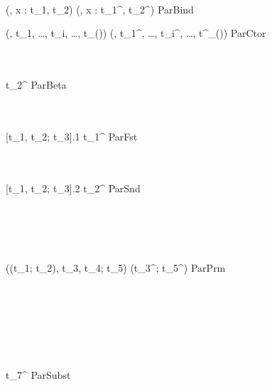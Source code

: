
\Rule{\ParBinderReduction}
    {
         \\
    }
    {(\kappa, x : t_1, t_2) \parred {}(\kappa, x : t_1^\prime, t_2^\prime) }
    {ParBind}

\Rule{\ParConstructorReduction}
    {
    }
    {(\kappa, t_1, \ldots, t_i, \ldots, t_{(\kappa)}) \parred {}(\kappa, t_1^\prime, \ldots, t_i^\prime, \ldots, t^\prime_{(\kappa)}) }
    {ParCtor}

\Rule{\ParBetaReduction}
    {
         \\
         \\
    }
    {  \parred [x := t_3^\prime]t_2^\prime }
    {ParBeta}

\Rule{\ParFstReduction}
    {
         \\
         \\
    }
    { [t_1, t_2; t_3].1 \parred t_1^\prime }
    {ParFst}

\Rule{\ParSndReduction}
    {
         \\
         \\
    }
    { [t_1, t_2; t_3].2 \parred t_2^\prime }
    {ParSnd}

\Rule{\ParPrmReduction}
    {
         \\
         \\
         \\
         \\
    }
    { \vartheta((t_1; t_2), t_3, t_4; t_5) \parred {}(t_3^\prime; t_5^\prime) }
    {ParPrm}

\Rule{\ParSubstReduction}
    {
         \\
         \\
         \\
         \\
         \\
         \\
    }
    {  \parred t_7^\prime}
    {ParSubst}

